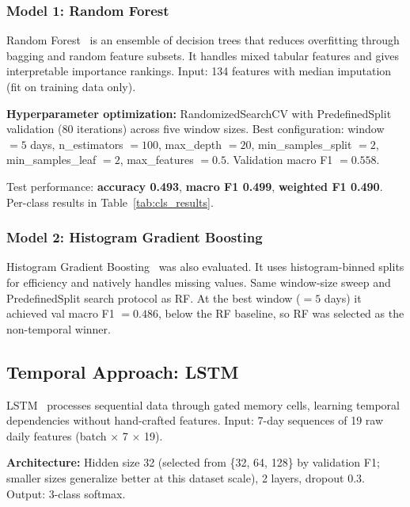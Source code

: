 \documentclass[runningheads]{llncs}
\begin{document}
\subsubsection{Model 1: Random Forest}

Random Forest~\cite{breiman2001} is an ensemble of decision trees that reduces overfitting through bagging and random feature subsets. It handles mixed tabular features and gives interpretable importance rankings. Input: 134 features with median imputation (fit on training data only).

\textbf{Hyperparameter optimization:} RandomizedSearchCV with PredefinedSplit validation (80 iterations) across five window sizes. Best configuration: window $= 5$ days, n\_estimators $= 100$, max\_depth $= 20$, min\_samples\_split $= 2$, min\_samples\_leaf $= 2$, max\_features $= 0.5$. Validation macro F1 $= 0.558$.

Test performance: \textbf{accuracy 0.493}, \textbf{macro F1 0.499}, \textbf{weighted F1 0.490}. Per-class results in Table~\ref{tab:cls_results}.

\subsubsection{Model 2: Histogram Gradient Boosting}

Histogram Gradient Boosting~\cite{friedman2001} was also evaluated. It uses histogram-binned splits for efficiency and natively handles missing values. Same window-size sweep and PredefinedSplit search protocol as RF. At the best window ($= 5$ days) it achieved val macro F1 $= 0.486$, below the RF baseline, so RF was selected as the non-temporal winner.

\subsection{Temporal Approach: LSTM}

LSTM~\cite{hochreiter1997} processes sequential data through gated memory cells, learning temporal dependencies without hand-crafted features. Input: 7-day sequences of 19 raw daily features (batch $\times$ 7 $\times$ 19).

\textbf{Architecture:} Hidden size 32 (selected from \{32, 64, 128\} by validation F1; smaller sizes generalize better at this dataset scale), 2 layers, dropout 0.3. Output: 3-class softmax.
\end{document}
